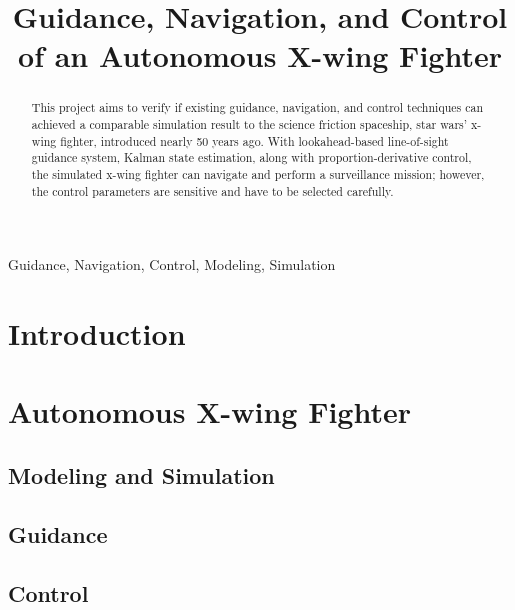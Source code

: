 \documentclass[conference]{IEEEtran}
\begin{document}
\title{Guidance, Navigation, and Control of an Autonomous X-wing Fighter}

\author{
}

\maketitle

\begin{abstract}
	This project aims to verify if existing guidance, navigation, and control techniques can achieved a comparable simulation result to the science friction spaceship, star wars' x-wing fighter, introduced nearly 50 years ago. With lookahead-based line-of-sight guidance system, Kalman state estimation, along with proportion-derivative control, the simulated x-wing fighter can navigate and perform a surveillance mission; however, the control parameters are sensitive and have to be selected carefully.
\end{abstract}

\begin{IEEEkeywords}
Guidance, Navigation, Control, Modeling, Simulation
\end{IEEEkeywords}

\section{Introduction}


\section{Autonomous X-wing Fighter}


\subsection{Modeling and Simulation}
\label{sec:model}


\subsection{Guidance}
\label{sec:guidance}


\subsection{Control}
\label{sec:control}

\end{document}
